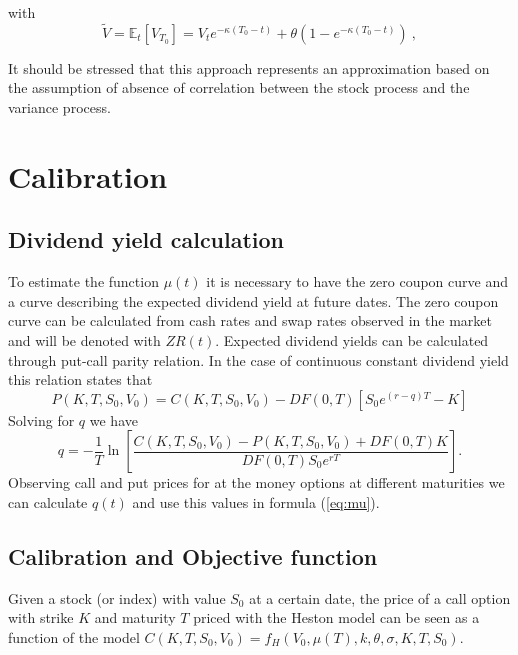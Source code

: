 with
\begin{equation}
\label{vol-cir-exp}
\tilde{V} = \mathbb{E}_t[ V_{T_0} ] = V_t  e^{-\kappa  (T_0 -t) } + \theta \left(1 - e^{-\kappa   (T_0 -t) }\right) \ ,
\end{equation}

It should be stressed that this approach represents an approximation based on the assumption of absence of correlation between the stock process and the variance process. 









\section{Calibration}

\subsection{Dividend yield calculation}

To estimate the function $\mu(t)$ it is necessary to have the zero coupon curve and a curve describing the expected dividend yield at future dates. The zero coupon curve can be calculated from cash rates and swap rates observed in the market and will be denoted with $ZR(t)$. Expected dividend yields can be calculated through put-call parity relation. In the case of continuous constant dividend yield this relation states that
\begin{equation}
P(K, T, S_0, V_0) = C(K, T, S_0, V_0)  - DF(0,T) \left[ S_0 e^{(r-q)T} - K \right]
\end{equation}
Solving for $q$ we have
\begin{equation}
q = -\frac{1}{T}\ln\left[\frac{C(K, T, S_0, V_0)-P(K, T, S_0, V_0) +DF(0,T) K}{DF(0,T)S_0 e^{rT}}\right].
\end{equation}
Observing call and put prices for at the money options at different maturities we can calculate $q(t)$ and use this values in formula (\ref{eq:mu}).

\subsection{Calibration and Objective function}

Given a stock (or index) with value $S_0$ at a certain date, the price of a call option with strike $K$ and maturity $T$ priced with the Heston model can be seen as a function of the model $C(K,T,S_0, V_0) = f_H(V_0, \mu(T), k, \theta, \sigma, K, T, S_0)$.

